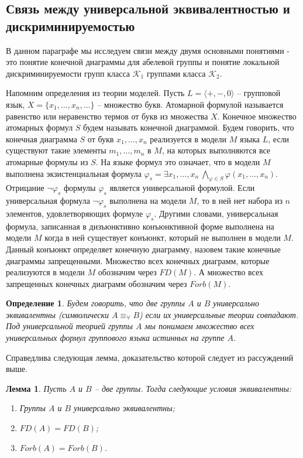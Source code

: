 \documentclass[a4paper,11pt,twoside]{article}
\newtheorem{lemma}{Лемма}[section]
\newtheorem{definition}{Определение}[section]
\def\K{{\mathcal{K}}}
\begin{document}
\subsection{Связь между универсальной эквивалентностью и дискриминируемостью}

В данном параграфе мы исследуем связи между двумя основными понятиями - это понятие конечной диаграммы для абелевой группы и понятие локальной дискриминируемости групп класса $\K_1$ группами класса $\K_2$.

Напомним определения из теории моделей. Пусть $L = \langle +, -, 0\rangle$ -- групповой язык, $X = \{x_1, \ldots, x_n, \ldots\}$ -- множество букв. Атомарной формулой называется равенство или неравенство термов от букв из множества $X$. Конечное множество атомарных формул $S$ будем называть конечной диаграммой. Будем говорить, что конечная диаграмма $S$ от букв $x_1, \ldots, x_n$ реализуется в модели $M$ языка $L$, если существуют такие элементы $m_1, \ldots, m_n$ в $M$, на которых выполняются все атомарные формулы из $S$. На языке формул это означает, что в модели $M$ выполнена экзистенциальная формула $\varphi_s = \exists x_1, \ldots, x_n \ \bigwedge\limits_{\varphi \in S} \varphi(x_1, \ldots, x_n)$. Отрицание $\neg\varphi_s$ формулы $\varphi_s$ является универсальной формулой. Если универсальная формула $\neg\varphi_s$ выполнена на модели $M$, то в ней нет набора из $n$ элементов, удовлетворяющих формуле $\varphi_s$. 
Другими словами, универсальная формула, записанная в дизъюнктивно конъюнктивной форме выполнена на модели $M$ когда в ней существует конъюнкт, который не выполнен в модели $M.$ Данный конъюнкт определяет конечную диаграмму, назовем такие конечные диаграммы запрещенными. Множество всех конечных диаграмм, которые реализуются в модели $M$ обозначим через $FD(M)$. А множество всех запрещенных конечных диаграмм обозначим через $Forb(M)$. 

\begin{definition}
Будем говорить, что две группы $A$ и $B$ универсально эквивалентны (символически $A \equiv_\forall B$) если их универсальные теории совпадают. Под универсальной теорией группы $A$ мы понимаем множество всех универсальных формул группового языка истинных на группе $A$.
\end{definition}
Справедлива следующая лемма, доказательство которой следует из рассуждений выше.

\begin{lemma}
Пусть $A$ и $B$ -- две группы. Тогда следующие условия эквивалентны:
\begin{enumerate}
\item Группы $A$ и $B$ универсально эквивалентны;
\item $FD(A) = FD(B)$;
\item $Forb(A) = Forb(B)$.
\end{enumerate}
\end{lemma}
\end{document}
